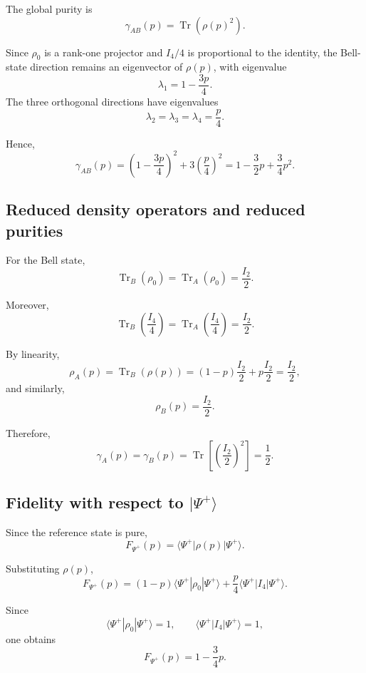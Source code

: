 \documentclass[a4paper]{article}
\begin{document}
The global purity is
\[
\gamma_{AB}(p) = \operatorname{Tr}\!\left(\rho(p)^2\right).
\]

Since \( \rho_0 \) is a rank-one projector and \( I_4/4 \) is proportional to the identity, the Bell-state direction remains an eigenvector of \( \rho(p) \), with eigenvalue
\[
\lambda_1 = 1-\frac{3p}{4}.
\]
The three orthogonal directions have eigenvalues
\[
\lambda_2=\lambda_3=\lambda_4=\frac{p}{4}.
\]

Hence,
\[
\gamma_{AB}(p)
=
\left(1-\frac{3p}{4}\right)^2
+
3\left(\frac{p}{4}\right)^2
=
1-\frac{3}{2}p+\frac{3}{4}p^2.
\]


\subsection*{Reduced density operators and reduced purities}

For the Bell state,
\[
\operatorname{Tr}_B(\rho_0)
=
\operatorname{Tr}_A(\rho_0)
=
\frac{I_2}{2}.
\]

Moreover,
\[
\operatorname{Tr}_B\!\left(\frac{I_4}{4}\right)
=
\operatorname{Tr}_A\!\left(\frac{I_4}{4}\right)
=
\frac{I_2}{2}.
\]

By linearity,
\[
\rho_A(p)
=
\operatorname{Tr}_B(\rho(p))
=
(1-p)\frac{I_2}{2}
+
p\frac{I_2}{2}
=
\frac{I_2}{2},
\]
and similarly,
\[
\rho_B(p)=\frac{I_2}{2}.
\]

Therefore,
\[
\gamma_A(p)
=
\gamma_B(p)
=
\operatorname{Tr}\!\left[\left(\frac{I_2}{2}\right)^2\right]
=
\frac{1}{2}.
\]


\subsection*{Fidelity with respect to \texorpdfstring{$|\Psi^+\rangle$}{|Psi+>}}

Since the reference state is pure,
\[
F_{\Psi^+}(p)
=
\langle\Psi^+|\rho(p)|\Psi^+\rangle.
\]

Substituting \( \rho(p) \),
\[
F_{\Psi^+}(p)
=
(1-p)\langle\Psi^+|\rho_0|\Psi^+\rangle
+
\frac{p}{4}\langle\Psi^+|I_4|\Psi^+\rangle.
\]

Since
\[
\langle\Psi^+|\rho_0|\Psi^+\rangle = 1,
\qquad
\langle\Psi^+|I_4|\Psi^+\rangle = 1,
\]
one obtains
\[
F_{\Psi^+}(p)
=
1-\frac{3}{4}p.
\]
\end{document}
